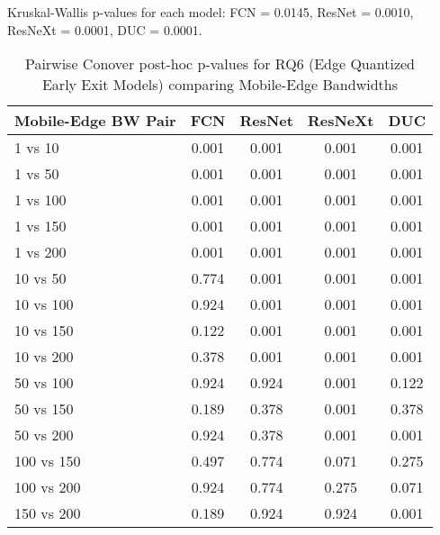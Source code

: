 \begin{table}[h]
\centering
\caption{Pairwise Conover post-hoc p-values for RQ6 (Edge Quantized Early Exit Models) comparing Mobile-Edge Bandwidths}
\label{tab:conover_edge_quantized_earlyexit}
\smallskip
Kruskal-Wallis p-values for each model: FCN = 0.0145, ResNet = 0.0010, ResNeXt = 0.0001, DUC = 0.0001.

\begin{tabular}{lcccc}
\toprule
Mobile-Edge BW Pair & FCN & ResNet & ResNeXt & DUC \\
\midrule
1 vs 10 & 0.001 & 0.001 & 0.001 & 0.001 \\
1 vs 50 & 0.001 & 0.001 & 0.001 & 0.001 \\
1 vs 100 & 0.001 & 0.001 & 0.001 & 0.001 \\
1 vs 150 & 0.001 & 0.001 & 0.001 & 0.001 \\
1 vs 200 & 0.001 & 0.001 & 0.001 & 0.001 \\
10 vs 50 & 0.774 & 0.001 & 0.001 & 0.001 \\
10 vs 100 & 0.924 & 0.001 & 0.001 & 0.001 \\
10 vs 150 & 0.122 & 0.001 & 0.001 & 0.001 \\
10 vs 200 & 0.378 & 0.001 & 0.001 & 0.001 \\
50 vs 100 & 0.924 & 0.924 & 0.001 & 0.122 \\
50 vs 150 & 0.189 & 0.378 & 0.001 & 0.378 \\
50 vs 200 & 0.924 & 0.378 & 0.001 & 0.001 \\
100 vs 150 & 0.497 & 0.774 & 0.071 & 0.275 \\
100 vs 200 & 0.924 & 0.774 & 0.275 & 0.071 \\
150 vs 200 & 0.189 & 0.924 & 0.924 & 0.001 \\
\bottomrule
\end{tabular}
\end{table}
